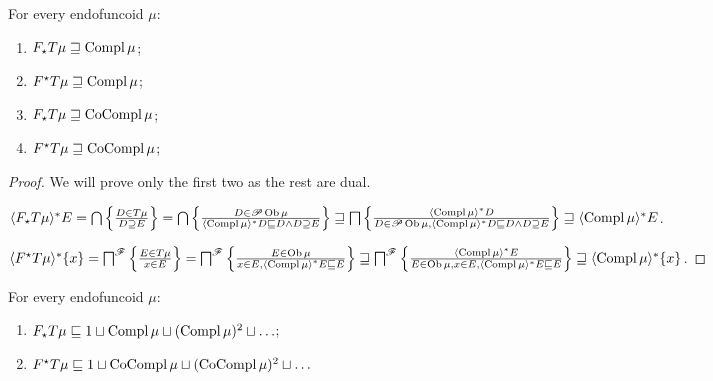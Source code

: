 \begin{prop}
  For every endofuncoid $\mu$:
  \begin{enumerate}
    \item $F_{\star} T \mu \sqsupseteq \operatorname{Compl} \mu$;
    \item $F^{\star} T \mu \sqsupseteq \operatorname{Compl} \mu$;
    \item $F_{\star} T \mu \sqsupseteq \operatorname{CoCompl} \mu$;
    \item $F^{\star} T \mu \sqsupseteq \operatorname{CoCompl} \mu$;
  \end{enumerate}
\end{prop}

\begin{proof}
  We will prove only the first two as the rest are dual.
  
  $\langle F_{\star} T \mu \rangle^{\ast} E =
  \bigcap \left\{ \frac{ D \in T \mu
  }{ D \supseteq E }\right\} = \bigcap \left\{ \frac{ D \in
  \mathscr{P} \operatorname{Ob} \mu }{ \langle \operatorname{Compl}
  \mu \rangle^{\ast} D \sqsubseteq D \wedge D \supseteq E }\right\} \sqsupseteq
  \bigsqcap \left\{ \frac{ \langle \operatorname{Compl} \mu \rangle^{\ast} D }{
  D \in \mathscr{P} \operatorname{Ob} \mu, \langle \operatorname{Compl} \mu
  \rangle^{\ast} D \sqsubseteq D \wedge D \supseteq E }\right\} \sqsupseteq
  \langle \operatorname{Compl} \mu \rangle^{\ast} E$.
  
  $\langle F^{\star} T \mu \rangle^{\ast} \{ x \} = \bigsqcap^{\mathscr{F}}
  \left\{ \frac{ E \in T \mu }{ x \in E }\right\} =
  \bigsqcap^{\mathscr{F}} \left\{ \frac{ E \in \operatorname{Ob} \mu }{
  x \in E, \left\langle \operatorname{Compl} \mu \right\rangle^{\ast} E
  \sqsubseteq E }\right\} \sqsupseteq \bigsqcap^{\mathscr{F}} \left\{ \frac{ \langle
  \operatorname{Compl} \mu \rangle^{\ast} E }{ E \in \operatorname{Ob}
  \mu, x \in E, \langle \operatorname{Compl} \mu \rangle^{\ast} E \sqsubseteq E }\right\}
  \sqsupseteq \langle \operatorname{Compl} \mu \rangle^{\ast} \{ x \}$.
\end{proof}

\begin{lem}
  For every endofuncoid $\mu$:
  \begin{enumerate}
    \item $F_{\star} T \mu \sqsubseteq 1 \sqcup \operatorname{Compl} \mu \sqcup
    (\operatorname{Compl} \mu)^2 \sqcup \ldots$;
    
    \item $F^{\star} T \mu \sqsubseteq 1 \sqcup \operatorname{CoCompl} \mu \sqcup
    (\operatorname{CoCompl} \mu)^2 \sqcup \ldots$
  \end{enumerate}
\end{lem}

